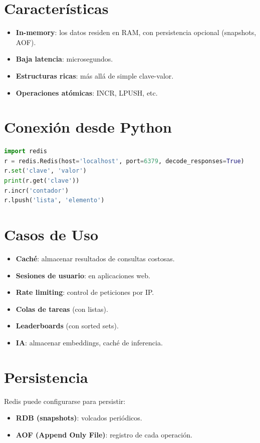 \documentclass[12pt,a4paper,openany,oneside]{book}
\begin{document}
\section{Características}
\begin{itemize}
    \item \textbf{In-memory}: los datos residen en RAM, con persistencia opcional (snapshots, AOF).
    \item \textbf{Baja latencia}: microsegundos.
    \item \textbf{Estructuras ricas}: más allá de simple clave-valor.
    \item \textbf{Operaciones atómicas}: INCR, LPUSH, etc.
\end{itemize}

\section{Conexión desde Python}
\begin{lstlisting}[language=Python]
import redis
r = redis.Redis(host='localhost', port=6379, decode_responses=True)
r.set('clave', 'valor')
print(r.get('clave'))
r.incr('contador')
r.lpush('lista', 'elemento')
\end{lstlisting}

\section{Casos de Uso}
\begin{itemize}
    \item \textbf{Caché}: almacenar resultados de consultas costosas.
    \item \textbf{Sesiones de usuario}: en aplicaciones web.
    \item \textbf{Rate limiting}: control de peticiones por IP.
    \item \textbf{Colas de tareas} (con listas).
    \item \textbf{Leaderboards} (con sorted sets).
    \item \textbf{IA}: almacenar embeddings, caché de inferencia.
\end{itemize}

\section{Persistencia}
Redis puede configurarse para persistir:
\begin{itemize}
    \item \textbf{RDB (snapshots)}: volcados periódicos.
    \item \textbf{AOF (Append Only File)}: registro de cada operación.
\end{itemize}
\end{document}
